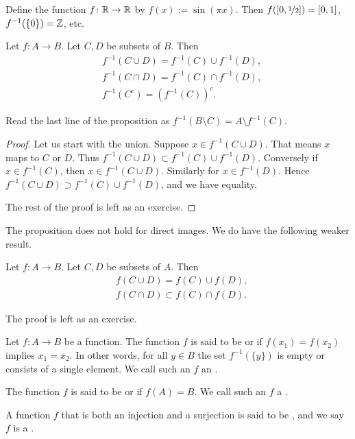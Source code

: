 \begin{example}
Define the function $f \colon {\mathbb{R}} \to {\mathbb{R}}$ by
$f(x) := \sin(\pi x)$.  Then $f([0,\nicefrac{1}{2}]) = [0,1]$, 
$f^{-1}(\{0\}) = {\mathbb{Z}}$, etc.
\end{example}

\begin{prop} \label{st:propinv}
Let $f \colon A \to B$.  Let $C, D$ be subsets of $B$.  Then
\begin{align*}
& f^{-1}( C \cup D) = f^{-1} (C) \cup f^{-1} (D) , \\
& f^{-1}( C \cap D) = f^{-1} (C) \cap f^{-1} (D) , \\
& f^{-1}( C^c) = {\left( f^{-1} (C) \right)}^c .
\end{align*}
\end{prop}

Read the last line of the proposition as
$f^{-1}( B \setminus C) = A \setminus f^{-1} (C)$.

\begin{proof}
Let us start with the union.  Suppose $x \in 
f^{-1}( C \cup D)$.  That means 
$x$ maps to $C$ or $D$.  Thus
$f^{-1}( C \cup D) \subset f^{-1} (C) \cup f^{-1} (D)$.  Conversely
if $x \in f^{-1}(C)$, then $x \in f^{-1}(C \cup D)$.  Similarly for
$x \in f^{-1}(D)$.  Hence
$f^{-1}( C \cup D) \supset f^{-1} (C) \cup f^{-1} (D)$, and we have
equality.

The rest of the proof is left as an exercise.
\end{proof}

The proposition does not hold for direct images.  We do have
the following weaker result.

\begin{prop} \label{st:propfor}
Let $f \colon A \to B$.  Let $C, D$ be subsets of $A$.  Then
\begin{align*}
& f( C \cup D) = f (C) \cup f (D) , \\
& f( C \cap D) \subset f (C) \cap f (D) .
\end{align*}
\end{prop}

The proof is left as an exercise.

\begin{defn}
Let $f \colon A \to B$ be a function.
The function $f$ is said to be
\emph{} or
\emph{} if $f(x_1) = f(x_2)$ implies $x_1 = x_2$.  In
other words,
for all $y \in B$ the set
$f^{-1}(\{y\})$ is empty or consists of a single element.
We call such an $f$ an \emph{}.

The function $f$ is said to be
\emph{} or
\emph{} if $f(A) = B$.
We call such an $f$ a \emph{}.

A function $f$ that is both an injection and a surjection is
said to be \emph{}, and we say $f$ is a
\emph{}.
\end{defn}

